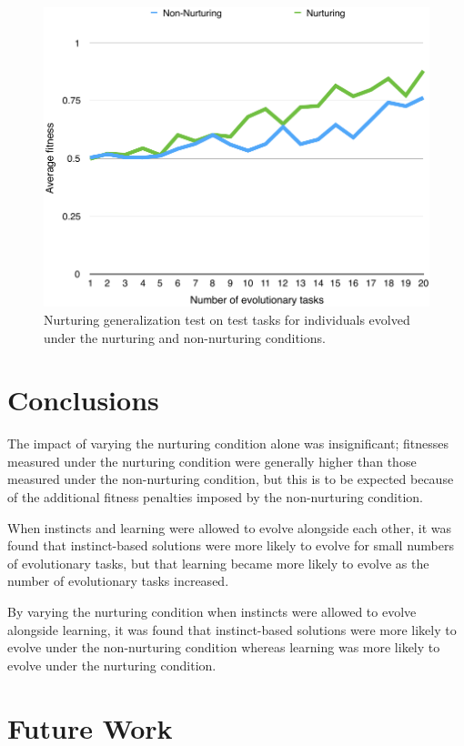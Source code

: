\documentclass[master]{outhesis}
\begin{document}
\begin{figure}[H]
	\centering
	\includegraphics{NurturingGeneralizationTestPlot.pdf}
	\caption{Nurturing generalization test on test tasks for individuals evolved under the nurturing and non-nurturing conditions.}
\end{figure}

\chapter{Conclusions}

The impact of varying the nurturing condition alone was insignificant; fitnesses measured under the nurturing condition were generally higher than those measured under the non-nurturing condition, but this is to be expected because of the additional fitness penalties imposed by the non-nurturing condition.

When instincts and learning were allowed to evolve alongside each other, it was found that instinct-based solutions were more likely to evolve for small numbers of evolutionary tasks, but that learning became more likely to evolve as the number of evolutionary tasks increased.

By varying the nurturing condition when instincts were allowed to evolve alongside learning, it was found that instinct-based solutions were more likely to evolve under the non-nurturing condition whereas learning was more likely to evolve under the nurturing condition.

\chapter{Future Work}
\end{document}
